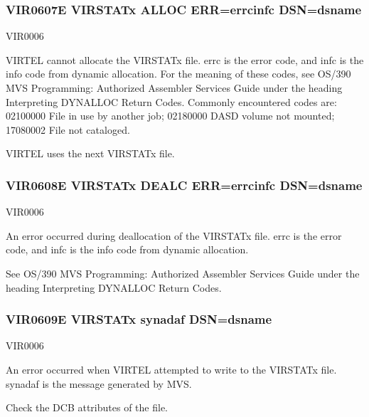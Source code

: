 \documentclass[letterpaper,10pt,english]{sphinxmanual}
\begin{document}
\subsubsection{VIR0607E VIRSTATx ALLOC ERR=errc\sphinxhyphen{}infc DSN=dsname}
\label{\detokenize{messages:vir0607e-virstatx-alloc-err-errc-infc-dsn-dsname}}\begin{description}
\sphinxAtStartPar
VIR0006

\sphinxAtStartPar
VIRTEL cannot allocate the VIRSTATx file. errc is the error code, and infc is the info code from dynamic allocation.  For the meaning of these codes, see OS/390 MVS Programming: Authorized Assembler Services Guide under the heading Interpreting DYNALLOC Return Codes. Commonly encountered codes are: 0210\sphinxhyphen{}0000 File in use by another job; 0218\sphinxhyphen{}0000 DASD volume not mounted; 1708\sphinxhyphen{}0002 File not cataloged.

\sphinxAtStartPar
VIRTEL uses the next VIRSTATx file.

\end{description}


\subsubsection{VIR0608E VIRSTATx DEALC ERR=errc\sphinxhyphen{}infc DSN=dsname}
\label{\detokenize{messages:vir0608e-virstatx-dealc-err-errc-infc-dsn-dsname}}\begin{description}
\sphinxAtStartPar
VIR0006

\sphinxAtStartPar
An error occurred during deallocation of the VIRSTATx file. errc is the error code, and infc is the info code from dynamic allocation.

\sphinxAtStartPar
See OS/390 MVS Programming: Authorized Assembler Services Guide under the heading Interpreting DYNALLOC Return Codes.

\end{description}


\subsubsection{VIR0609E VIRSTATx synadaf DSN=dsname}
\label{\detokenize{messages:vir0609e-virstatx-synadaf-dsn-dsname}}\begin{description}
\sphinxAtStartPar
VIR0006

\sphinxAtStartPar
An error occurred when VIRTEL attempted to write to the VIRSTATx file. synadaf is the message generated by MVS.

\sphinxAtStartPar
Check the DCB attributes of the file.

\end{description}
\end{document}
